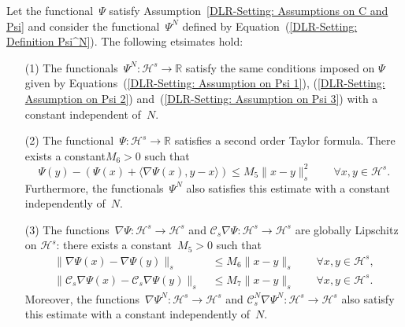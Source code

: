 \begin{lemma}\autocite[Lemma 2.4]{Pillai2012}
\label{DLR-Seeting: Lemma: Properties of Psi and Psi^N}
 Let the functional~$\Psi$ satisfy Assumption~\ref{DLR-Setting: Assumptions on C and Psi} and consider the functional~$\Psi^N$ defined by Equation~(\ref{DLR-Setting: Definition Psi^N}). The following etsimates hold:
 \begin{enumerate}
  \item[(1)] The functionals~$\Psi^N : \mathcal{H}^s \to \mathbb{R}$ satisfy the same conditions imposed on $\Psi$ given by Equations~(\ref{DLR-Setting: Assumption on Psi 1}), (\ref{DLR-Setting: Assumption on Psi 2}) and~(\ref{DLR-Setting: Assumption on Psi 3}) with a constant independent of~$N$.
  \item[(2)]  The functional~$\Psi: \mathcal{H}^s \to \mathbb{R}$ satisfies a second order Taylor formula. There exists a constant$M_6 >0$ such that
  \begin{equation}
  \label{DLR-Setting: Psi Taylor formula}
   \Psi(y) - \left( \Psi(x) + \langle \nabla \Psi(x), y-x \rangle \right) \leq M_5 \|x-y\|_s^2 \qquad \forall x,y \in \mathcal{H}^s. 
  \end{equation}
  Furthermore, the functionals~$\Psi^N$ also satisfies this estimate with a constant independently of~$N$.
  \item[(3)] The functions~$\nabla \Psi: \mathcal{H}^s \to \mathcal{H}^s$ and $\mathcal{C}_s\nabla \Psi: \mathcal{H}^s \to \mathcal{H}^s$ are globally Lipschitz on $\mathcal{H}^s$: there exists a constant~$M_5>0$ such that
  \begin{equation*}
    \begin{split}
      \|\nabla \Psi (x) - \nabla \Psi (y) \|_s & \; \leq M_6 \|x - y \|_s \qquad \forall x,y \in \mathcal{H}^s, \\
       \| \mathcal{C}_s\nabla \Psi (x) - \mathcal{C}_s\nabla \Psi (y) \|_s & \; \leq M_7 \|x - y \|_s \qquad \forall x,y \in \mathcal{H}^s.
    \end{split}
  \end{equation*}
  Moreover, the functions~$\nabla \Psi^N: \mathcal{H}^s \to \mathcal{H}^s$ and $\mathcal{C}_s^N\nabla \Psi^N: \mathcal{H}^s \to \mathcal{H}^s$ also satisfy this estimate with a constant independently of~$N$.
 \end{enumerate}

\end{lemma}

